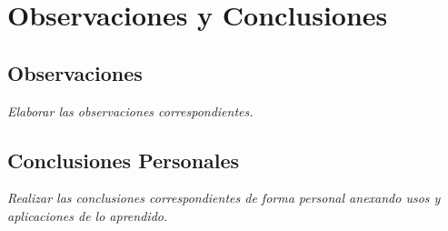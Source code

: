 \documentclass[11pt]{scrartcl}
\newcommand{\indicacion}[1]{\noindent\textit{\small #1}}
\begin{document}
\section{Observaciones y Conclusiones}

\subsection{Observaciones}
\indicacion{
    Elaborar las observaciones correspondientes.
}

\subsection{Conclusiones Personales}
\indicacion{
    Realizar las conclusiones correspondientes de forma personal anexando usos y aplicaciones de lo aprendido.
}


  

    
\end{document}

